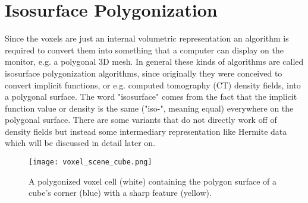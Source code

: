 \section{Isosurface Polygonization}

Since the voxels are just an internal volumetric representation an algorithm is required to convert them into something that a computer can display on the monitor, e.g. a polygonal 3D mesh. In general these kinds of algorithms are
called isosurface polygonization algorithms, since originally
they were conceived to convert implicit functions, or e.g.
computed tomography (CT) density fields, into a polygonal surface. The word "isosurface" comes from the fact that the implicit function value or density is the same ("iso-", meaning equal) everywhere on the polygonal surface. There are some variants that do not directly work off of density fields but instead some intermediary representation like Hermite data which will be discussed in detail later on.

\begin{figure}
\centering
\captionsetup{width=0.8\textwidth}
\texttt{[image: voxel\_scene\_cube.png]}
\caption{A polygonized voxel cell (white) containing the polygon surface of a cube's corner (blue) with a sharp feature (yellow).}
\label{fig:polygonized_cube_voxel_cell}
\end{figure}



